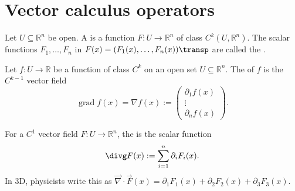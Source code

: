 
\section{Vector calculus operators}
\label{sec:vector_calculus_operators}

\begin{definition}
\label{def:vector_field}
Let $U \subseteq \mathbb{R}^n$ be open. A   is a function $F : U \to \mathbb{R}^n$ of class $C^k(U,\mathbb{R}^n)$.
The scalar functions $F_1, \dots, F_n$ in $F(x) = (F_1(x), \dots, F_n(x))\transp$ are called the .
\end{definition}

\begin{definition}[Gradient]
\label{def:gradient_vector_field}
Let $f : U \to \mathbb{R}$ be a function of class $C^k$ on an open set $U \subseteq \mathbb{R}^n$. The  of $f$ is the $C^{k-1}$ vector field
\[\operatorname{grad} f(x) = \nabla f(x) := \begin{pmatrix} \partial_1 f(x) \\ \vdots \\ \partial_n f(x) \end{pmatrix}.\]
\end{definition}

\begin{definition}[Divergence]
\label{def:divergence}
For a $C^1$ vector field $F : U \to \mathbb{R}^n$, the  is the scalar function
\[\divg F(x) := \sum_{i=1}^n \partial_i F_i(x).\]
In 3D, physicists write this as $\vec{\nabla} \cdot \vec{F}(x) = \partial_1 F_1(x) + \partial_2 F_2(x) + \partial_3 F_3(x)$.
\end{definition}

